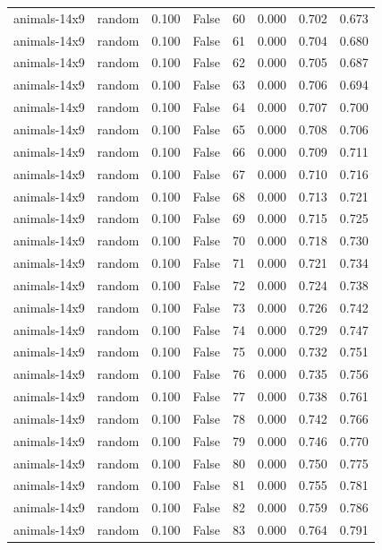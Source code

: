 \begin{tabular}{llrrrrrr}
animals-14x9 & random & 0.100 & False & 60 & 0.000 & 0.702 & 0.673 \\
animals-14x9 & random & 0.100 & False & 61 & 0.000 & 0.704 & 0.680 \\
animals-14x9 & random & 0.100 & False & 62 & 0.000 & 0.705 & 0.687 \\
animals-14x9 & random & 0.100 & False & 63 & 0.000 & 0.706 & 0.694 \\
animals-14x9 & random & 0.100 & False & 64 & 0.000 & 0.707 & 0.700 \\
animals-14x9 & random & 0.100 & False & 65 & 0.000 & 0.708 & 0.706 \\
animals-14x9 & random & 0.100 & False & 66 & 0.000 & 0.709 & 0.711 \\
animals-14x9 & random & 0.100 & False & 67 & 0.000 & 0.710 & 0.716 \\
animals-14x9 & random & 0.100 & False & 68 & 0.000 & 0.713 & 0.721 \\
animals-14x9 & random & 0.100 & False & 69 & 0.000 & 0.715 & 0.725 \\
animals-14x9 & random & 0.100 & False & 70 & 0.000 & 0.718 & 0.730 \\
animals-14x9 & random & 0.100 & False & 71 & 0.000 & 0.721 & 0.734 \\
animals-14x9 & random & 0.100 & False & 72 & 0.000 & 0.724 & 0.738 \\
animals-14x9 & random & 0.100 & False & 73 & 0.000 & 0.726 & 0.742 \\
animals-14x9 & random & 0.100 & False & 74 & 0.000 & 0.729 & 0.747 \\
animals-14x9 & random & 0.100 & False & 75 & 0.000 & 0.732 & 0.751 \\
animals-14x9 & random & 0.100 & False & 76 & 0.000 & 0.735 & 0.756 \\
animals-14x9 & random & 0.100 & False & 77 & 0.000 & 0.738 & 0.761 \\
animals-14x9 & random & 0.100 & False & 78 & 0.000 & 0.742 & 0.766 \\
animals-14x9 & random & 0.100 & False & 79 & 0.000 & 0.746 & 0.770 \\
animals-14x9 & random & 0.100 & False & 80 & 0.000 & 0.750 & 0.775 \\
animals-14x9 & random & 0.100 & False & 81 & 0.000 & 0.755 & 0.781 \\
animals-14x9 & random & 0.100 & False & 82 & 0.000 & 0.759 & 0.786 \\
animals-14x9 & random & 0.100 & False & 83 & 0.000 & 0.764 & 0.791 \\

\end{tabular}
